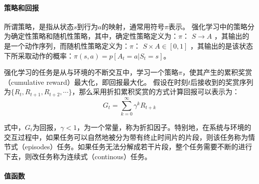 




\paragraph{策略和回报}
所谓策略，是指从状态$s$到行为$a$的映射，通常用符号$\pi$表示。
强化学习中的策略分为确定性策略和随机性策略，其中，确定性策略定义为：$\pi$： $S \to A$ ，其输出的是一个动作序列，而随机性策略定义为：$\pi$： $S \times A \in [0,1]$ ，其输出的是该状态下所采取动作的概率：$\pi(s,a)=p[A_{t}=a|S_{t}=s]$。

强化学习的任务是从与环境的不断交互中，学习一个策略$\pi$，使其产生的累积奖赏（cumulative reward）最大化，即回报最大化。
假设在时刻$t$后接收到的奖赏序列为$\{R_{t}, R_{t+1}, R_{t+2},\cdots\}$，那么采用折扣累积奖赏的方式计算回报可以表示为：
\begin{equation}\label{seq:reward}
G_{t}=\sum_{k=0}^{\infty}\gamma^{k}R_{t+k}
\end{equation}

式中，$G_{t}$为回报，$\gamma<1$，为一个常量，称为折扣因子。特别地，在系统与环境的交互过程中，如果任务可以自然地被分为带有终止时间片的片段，则该任务称为情节式（episodes）任务。如果任务无法分解成若干片段，整个任务需要不断的进行下去，则改任务称为连续式（continous）任务。

\paragraph{值函数}

